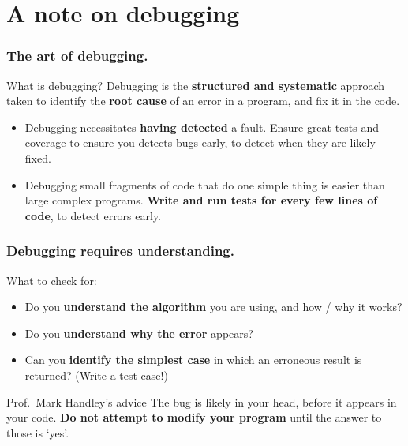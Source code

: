 \documentclass{beamer} %
\newcommand\emc[1]{\textcolor{brightblue}{\textbf{#1}}}
\begin{document}
\section{A note on debugging}

\begin{frame}
\frametitle{The art of debugging.}

\begin{block}{What is debugging?}
Debugging is the \emc{structured and systematic} approach taken to identify the \emc{root cause} of an error in a program, and fix it in the code.
\end{block}

\begin{itemize}
	\item Debugging necessitates \emc{having detected} a fault. Ensure great tests and coverage to ensure you detects bugs early, to detect when they are likely fixed.
	\item Debugging small fragments of code that do one simple thing is easier than large complex programs. \emc{Write and run tests for every few lines of code}, to detect errors early.
\end{itemize}

\end{frame}

\begin{frame}
\frametitle{Debugging requires understanding.}

What to check for:
\begin{itemize}
	\item Do you \emc{understand the algorithm} you are using, and how / why it works?
	\item Do you \emc{understand why the error} appears?
	\item Can you \emc{identify the simplest case} in which an erroneous result is returned? (Write a test case!)
\end{itemize}

\begin{block}{Prof.\ Mark Handley's advice}
The bug is likely in your head, before it appears in your code. \emc{Do not attempt to modify your program} until the answer to those is `yes'.
\end{block}

\end{frame}
\end{document}
